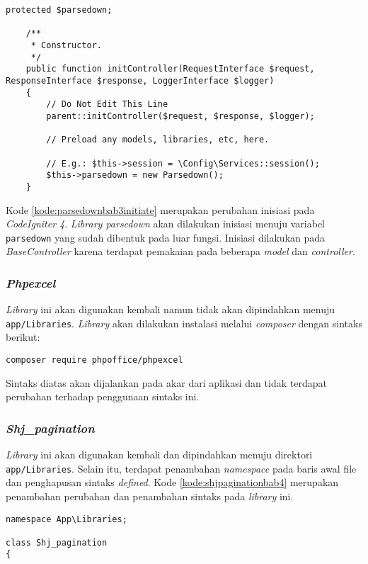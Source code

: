 \begin{lstlisting}[caption=Perancangan perubahan inisiasi \textit{library Parsedown} pada \textit{controller CodeIgniter 4}, label=kode:parsedownbab3initiate]
 	protected $parsedown;

    /**
     * Constructor.
     */
    public function initController(RequestInterface $request, ResponseInterface $response, LoggerInterface $logger)
    {
        // Do Not Edit This Line
        parent::initController($request, $response, $logger);

        // Preload any models, libraries, etc, here.

        // E.g.: $this->session = \Config\Services::session();
        $this->parsedown = new Parsedown();
    }
\end{lstlisting}

Kode \ref{kode:parsedownbab3initiate} merupakan perubahan inisiasi pada \textit{CodeIgniter 4}. \textit{Library parsedown} akan dilakukan inisiasi menuju variabel \texttt{parsedown} yang sudah dibentuk pada luar fungsi. Inisiasi dilakukan pada \textit{BaseController} karena terdapat pemakaian pada beberapa \textit{model} dan \textit{controller}. 

\subsubsection{\textit{Phpexcel}}
\textit{Library} ini akan digunakan kembali namun tidak akan dipindahkan menuju \texttt{app/Libraries}. \textit{Library} akan dilakukan instalasi melalui \textit{composer} dengan sintaks berikut:
\begin{center}
	\verb|composer require phpoffice/phpexcel|
\end{center}
Sintaks diatas akan dijalankan pada akar dari aplikasi dan tidak terdapat perubahan terhadap penggunaan sintaks ini.

\subsubsection{\textit{Shj\_pagination}}
\textit{Library} ini akan digunakan kembali dan dipindahkan menuju direktori \texttt{app/Libraries}. Selain itu, terdapat penambahan \textit{namespace} pada baris awal file dan penghapusan sintaks \textit{defined}. Kode \ref{kode:shjpaginationbab4} merupakan penambahan perubahan dan penambahan sintaks pada \textit{library} ini.

\begin{lstlisting}[caption=Perancangan perubahan \textit{library Shj\_pagination} pada \textit{CodeIgniter 4}, label=kode:shjpaginationbab4]
namespace App\Libraries;

class Shj_pagination
{
\end{lstlisting}

